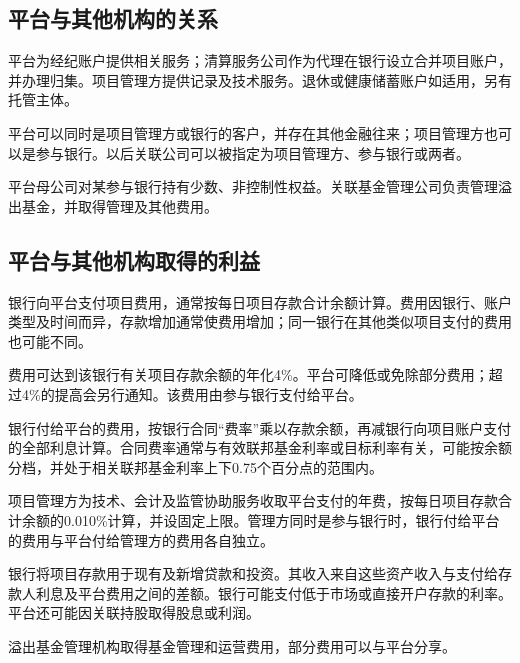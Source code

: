 \documentclass[UTF8,fontset=none,11pt,a4paper]{ctexart}
\begin{document}
\subsection*{平台与其他机构的关系}
平台为经纪账户提供相关服务；清算服务公司作为代理在银行设立合并项目账户，并办理归集。项目管理方提供记录及技术服务。退休或健康储蓄账户如适用，另有托管主体。


平台可以同时是项目管理方或银行的客户，并存在其他金融往来；项目管理方也可以是参与银行。以后关联公司可以被指定为项目管理方、参与银行或两者。


平台母公司对某参与银行持有少数、非控制性权益。关联基金管理公司负责管理溢出基金，并取得管理及其他费用。


\subsection*{平台与其他机构取得的利益}
银行向平台支付项目费用，通常按每日项目存款合计余额计算。费用因银行、账户类型及时间而异，存款增加通常使费用增加；同一银行在其他类似项目支付的费用也可能不同。


费用可达到该银行有关项目存款余额的年化4\%。平台可降低或免除部分费用；超过4\%的提高会另行通知。该费用由参与银行支付给平台。


银行付给平台的费用，按银行合同“费率”乘以存款余额，再减银行向项目账户支付的全部利息计算。合同费率通常与有效联邦基金利率或目标利率有关，可能按余额分档，并处于相关联邦基金利率上下0.75个百分点的范围内。


项目管理方为技术、会计及监管协助服务收取平台支付的年费，按每日项目存款合计余额的0.010\%计算，并设固定上限。管理方同时是参与银行时，银行付给平台的费用与平台付给管理方的费用各自独立。


银行将项目存款用于现有及新增贷款和投资。其收入来自这些资产收入与支付给存款人利息及平台费用之间的差额。银行可能支付低于市场或直接开户存款的利率。平台还可能因关联持股取得股息或利润。


溢出基金管理机构取得基金管理和运营费用，部分费用可以与平台分享。
\end{document}
